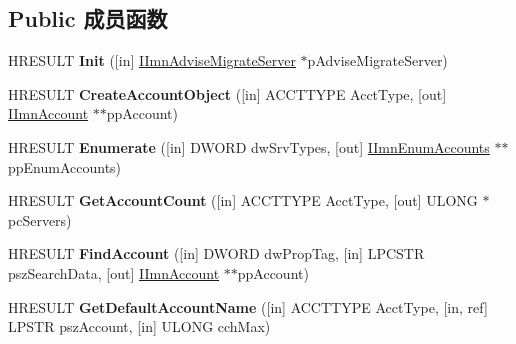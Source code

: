 \subsection*{Public 成员函数}
\begin{DoxyCompactItemize}
\item 
\mbox{\label{interface_i_imn_account_manager_aafab4cdede4c6077d56094a6e216ed26}} 
H\+R\+E\+S\+U\+LT {\bfseries Init} (\mbox{[}in\mbox{]} \hyperlink{interface_i_imn_advise_migrate_server}{I\+Imn\+Advise\+Migrate\+Server} $\ast$p\+Advise\+Migrate\+Server)
\item 
\mbox{\label{interface_i_imn_account_manager_a4ac6bc6f558bdf56aaee8a533e34839a}} 
H\+R\+E\+S\+U\+LT {\bfseries Create\+Account\+Object} (\mbox{[}in\mbox{]} A\+C\+C\+T\+T\+Y\+PE Acct\+Type, \mbox{[}out\mbox{]} \hyperlink{interface_i_imn_account}{I\+Imn\+Account} $\ast$$\ast$pp\+Account)
\item 
\mbox{\label{interface_i_imn_account_manager_ad4431fd5ca41d0ff9d7d9d5f84e70f65}} 
H\+R\+E\+S\+U\+LT {\bfseries Enumerate} (\mbox{[}in\mbox{]} D\+W\+O\+RD dw\+Srv\+Types, \mbox{[}out\mbox{]} \hyperlink{interface_i_imn_enum_accounts}{I\+Imn\+Enum\+Accounts} $\ast$$\ast$pp\+Enum\+Accounts)
\item 
\mbox{\label{interface_i_imn_account_manager_a399a937ceca1418357c84f965fc297ee}} 
H\+R\+E\+S\+U\+LT {\bfseries Get\+Account\+Count} (\mbox{[}in\mbox{]} A\+C\+C\+T\+T\+Y\+PE Acct\+Type, \mbox{[}out\mbox{]} U\+L\+O\+NG $\ast$pc\+Servers)
\item 
\mbox{\label{interface_i_imn_account_manager_aa6a351c4fef28fb602c7b054af0a4920}} 
H\+R\+E\+S\+U\+LT {\bfseries Find\+Account} (\mbox{[}in\mbox{]} D\+W\+O\+RD dw\+Prop\+Tag, \mbox{[}in\mbox{]} L\+P\+C\+S\+TR psz\+Search\+Data, \mbox{[}out\mbox{]} \hyperlink{interface_i_imn_account}{I\+Imn\+Account} $\ast$$\ast$pp\+Account)
\item 
\mbox{\label{interface_i_imn_account_manager_a32f5673a921bb102cc0e915da392177f}} 
H\+R\+E\+S\+U\+LT {\bfseries Get\+Default\+Account\+Name} (\mbox{[}in\mbox{]} A\+C\+C\+T\+T\+Y\+PE Acct\+Type, \mbox{[}in, ref\mbox{]} L\+P\+S\+TR psz\+Account, \mbox{[}in\mbox{]} U\+L\+O\+NG cch\+Max)
$$
\end{DoxyCompactItemize}
